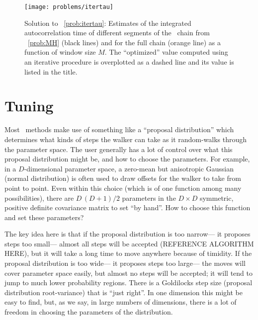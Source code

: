 \documentclass[modern]{aastex61}
\newcommand{\MCMC}{\acronym{MCMC}}
\begin{document}
\begin{figure}[!htbp]
\begin{center}
\texttt{[image: problems/itertau]}
\end{center}
\caption{Solution to \problemname~\ref{prob:itertau}:
Estimates of the integrated autocorrelation time of different segments of the
\MCMC\ chain from \problemname~\ref{prob:MH} (black lines) and for the full
chain (orange line) as a function of window size $M$.
The ``optimized'' value computed using an iterative procedure is overplotted
as a dashed line and its value is listed in the title.}
\label{fig:itertau}
\end{figure}

\section{Tuning}\label{sec:tuning}

Most \MCMC\ methods make use of something like a ``proposal distribution''
  which determines what kinds of steps the walker can take
  as it random-walks through the parameter space.
The user generally has a lot of control over what this proposal distribution might be,
  and how to choose the parameters.
For example, in a $D$-dimensional parameter space, %
  a zero-mean but anisotropic Gaussian (normal distribution)
  is often used to draw offsets for the walker to take from point to point.
Even within this choice (which is of one function among many possibilities),
  there are $D\,(D+1)/2$ parameters in the $D\times D$ symmetric, positive definite covariance matrix
  to set ``by hand''.
How to choose this function and set these parameters?

The key idea here is that if the proposal distribution is too narrow---%
  it proposes steps too small---%
  almost all steps will be accepted (REFERENCE ALGORITHM HERE),
  but it will take a long time to move anywhere because of timidity.
If the proposal distribution is too wide---%
  it proposes steps too large---%
  the moves will cover parameter space easily,
  but almost no steps will be accepted;
  it will tend to jump to much lower probability regions.
There is a Goldilocks step size (proposal distribution root-variance) that is ``just right''.
In one dimension this might be easy to find,
  but, as we say, in large numbers of dimensions,
  there is a lot of freedom in choosing the parameters of the distribution.

\end{document}
